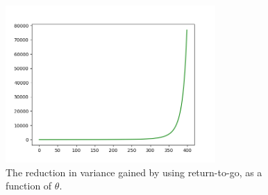 \documentclass[10pt]{article}
\theoremstyle{definition}
\begin{document}
\begin{enumerate}
\begin{enumerate}[label=(\alph*)]
\begin{figure}[h]
\caption{The reduction in variance gained by using return-to-go, as a function of $\theta$.}
\label{fig:variance-diff}
\centering
\includegraphics[width=8cm]{Figure_2}
\end{figure}

\end{enumerate}


\end{enumerate}
\end{document}
